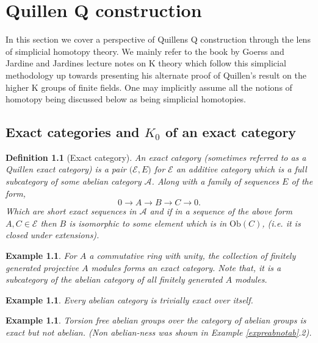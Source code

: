 \documentclass[12pt]{report}
\numberwithin{equation}{section}
\newtheorem{definition}[dummy]{Definition}
\newtheorem{example}[dummy]{Example}
\begin{document}
	\chapter{Quillen Q construction}
		
	In this section we cover a perspective of Quillens Q construction through the lens of simplicial homotopy theory. We mainly refer to the book by Goerss and Jardine \cite{Goerss_Jardine_2009} and Jardines lecture notes on K theory \cite{jardinenotes} which follow this simplicial methodology up towards presenting his alternate proof of Quillen's result on the higher K groups of finite fields. One may implicitly assume all the notions of homotopy being discussed below as being simplicial homotopies.
		
		
	\section{Exact categories and \( K_0 \) of an exact category}
	\begin{definition}[Exact category]\label{defexactcat}
			An exact category (sometimes referred to as a Quillen exact category) is a pair $\mathcal{(E},E)$ for $\mathcal{E}$ an additive category which is a full subcategory of some abelian category $\mathcal{A}$. Along with a family of sequences $E$ of the form, \[ 0 \to A \to B \to C \to 0. \] Which are short exact sequences in $\mathcal{A}$ and if in a sequence of the above form $A, C \in \mathcal{E}$ then $B $ is isomorphic to some element which is in $\mathrm{Ob}(C)$, (i.e. it is closed under extensions).
	\end{definition}
	\begin{example}
			For \(A\) a commutative ring with unity, the collection of finitely generated projective \( A \) modules forms an exact category. Note that, it is a subcategory of the abelian category of all finitely generated \( A \) modules.
	\end{example}
	\begin{example}
			Every abelian category is trivially exact over itself.
	\end{example}
	\begin{example}Torsion free abelian groups over the category of abelian groups is exact but not abelian. (Non abelian-ness was shown in Example \ref{expreabnotab}.2).
	\end{example}
		
\end{document}
